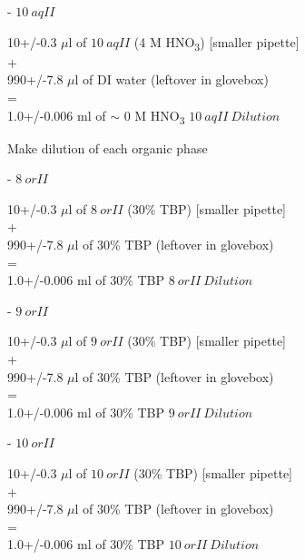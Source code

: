 \documentclass[idxtotoc,hyperref,openany,oneside]{labbook} %
\newcommand{\cmark}{\ding{51}}%
\newcommand{\done}{\rlap{$\square$}{\raisebox{2pt}{\large\hspace{1pt}\cmark}}%
  \hspace{-2.5pt}}
\newcommand{\tsbs}{\textsubscript}
\begin{document}
\begin{todolist}
\begin{todolist}
\item[\done]{- $\boxed{10\ aqII}$}
\end{todolist}
\begin{center}
10+/-0.3 $\mu$l of $\boxed{10\ aqII}$ (4 M HNO\tsbs{3}) [smaller pipette]\\
+\\
990+/-7.8 $\mu$l of DI water (leftover in glovebox)\\
=\\
1.0+/-0.006 ml of $\sim$ 0 M HNO\tsbs{3} $\boxed{10\ aqII\ Dilution}$
\end{center}


\item{Make dilution of each organic phase}
\begin{todolist}
\item[\done]{- $\boxed{8\ orII}$}
\end{todolist}
\begin{center}
10+/-0.3 $\mu$l of $\boxed{8\ orII}$ (30\% TBP) [smaller pipette]\\
+\\
990+/-7.8 $\mu$l of 30\% TBP (leftover in glovebox)\\
=\\
1.0+/-0.006 ml of 30\% TBP $\boxed{8\ orII\ Dilution}$
\end{center}

\begin{todolist}
\item[\done]{- $\boxed{9\ orII}$}
\end{todolist}
\begin{center}
10+/-0.3 $\mu$l of $\boxed{9\ orII}$ (30\% TBP) [smaller pipette]\\
+\\
990+/-7.8 $\mu$l of 30\% TBP (leftover in glovebox)\\
=\\
1.0+/-0.006 ml of 30\% TBP $\boxed{9\ orII\ Dilution}$
\end{center}

\begin{todolist}
\item[\done]{- $\boxed{10\ orII}$}
\end{todolist}
\begin{center}
10+/-0.3 $\mu$l of $\boxed{10\ orII}$ (30\% TBP) [smaller pipette]\\
+\\
990+/-7.8 $\mu$l of 30\% TBP (leftover in glovebox)\\
=\\
1.0+/-0.006 ml of 30\% TBP $\boxed{10\ orII\ Dilution}$
\end{center}

\end{todolist}
\end{document}
